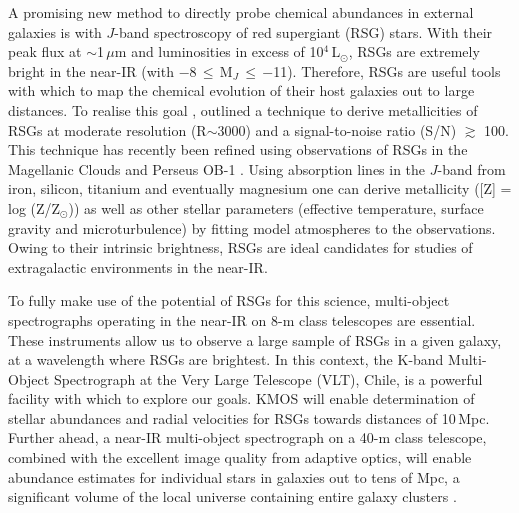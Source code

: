 \documentclass[iop]{emulateapj}
\def\2{\footnotesize II\normalsize}
\begin{document}
\label{sec:introduction}
A promising new method to directly probe chemical abundances in external galaxies is with $J$-band spectroscopy of red supergiant (RSG) stars.
With their peak flux at
$\sim$1\,$\mu$m and luminosities in excess of
10$^4$\,L$_\odot$, RSGs are extremely bright in the near-IR
(with $-$8\,$\le$\,M$_{J}$\,$\le$\,$-$11).
Therefore, RSGs are useful tools with which to map the chemical evolution of their host galaxies out to large distances.
To realise this goal
\cite{Davies10}, outlined a technique to derive metallicities of RSGs at moderate resolution
(R$\sim$3000) and a signal-to-noise ratio (S/N)
$\gtrsim$ 100.
This technique has recently been refined using observations of RSGs in the Magellanic Clouds
\citep{Davies14} and Perseus OB-1
\citep{2014ApJ...788...58G}.
Using absorption lines in the $J$-band from iron, silicon, titanium and eventually magnesium one can derive metallicity
([Z] = log (Z/Z$_{\odot}$)) as well as other stellar parameters
(effective temperature, surface gravity and microturbulence) by fitting model atmospheres to the observations.
Owing to their intrinsic brightness,
RSGs are ideal candidates for studies of extragalactic environments in the near-IR.

To fully make use of the potential of RSGs for this science, multi-object spectrographs operating in the near-IR on 8-m class telescopes are essential.
These instruments allow us to observe a large sample of RSGs in a given galaxy, at a wavelength where RSGs are brightest.
In this context, the K-band Multi-Object Spectrograph
\citep[KMOS;][]{2013Msngr.151...21S} at the Very Large Telescope (VLT), Chile, is a powerful facility with which to explore our goals.
KMOS will enable determination of stellar abundances and radial velocities for RSGs towards distances of 10\,Mpc.
Further ahead, a near-IR multi-object spectrograph on a 40-m class telescope, combined with the excellent image quality from adaptive optics,
will enable abundance estimates for individual stars in galaxies out to tens of Mpc,
a significant volume of the local universe containing entire galaxy clusters
\citep{Evans11}.
\end{document}
